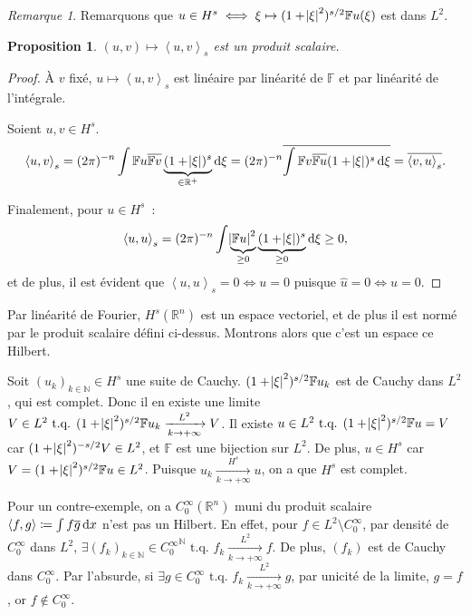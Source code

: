 \documentclass{report}
\newcommand{\R}{{\mathbb R}}
\newcommand{\N}{{\mathbb N}}
\newcommand{\scpr}[2]{\left\langle#1, #2\right\rangle}
\newcommand{\tq}{\text{ t.q. }}
\newcommand{\pinfty}{{+\infty}}
\newcommand{\dx}{\dif x}
\newtheorem{prp}[thm]{Proposition}
\theoremstyle{definition}
\theoremstyle{remark}
\newtheorem*{rmq}{Remarque}
\begin{document}
\begin{rmq} Remarquons que $u \in H^s \iff \xi \mapsto (1+\abs \xi^2)^{s/2}\mathbb Fu(\xi)$ est dans $L^2$.
\end{rmq}


\begin{prp} $(u, v) \mapsto \scpr uv_s$ est un produit scalaire.
\end{prp}

\begin{proof} À $v$ fixé, $u \mapsto \scpr uv_s$ est linéaire par linéarité de $\mathbb F$ et par linéarité de l'intégrale.

Soient $u, v \in H^s$.
\[\scpr uv_s = (2\pi)^{-n}\int \mathbb Fu\overline {\mathbb Fv}\underbrace {(1+\abs \xi)^s}_{\in \R^+}\dif\xi
	= (2\pi)^{-n}\overline {\int \mathbb Fv\overline {\mathbb Fu}(1+\abs \xi)^s\dif\xi} = \overline {\scpr vu_s}.\]

Finalement, pour $u \in H^s$~:
\[\scpr uu_s = (2\pi)^{-n}\int\underbrace {\abs {\mathbb Fu}^2}_{\geq 0}\underbrace {(1+\abs\xi)^s}_{\geq 0}\dif\xi \geq 0,\]
et de plus, il est évident que $\scpr uu_s = 0 \iff u = 0$ puisque $\hat u = 0 \iff u = 0$.
\end{proof}

Par linéarité de Fourier, $H^s(\R^n)$ est un espace vectoriel, et de plus il est normé par le produit scalaire défini ci-dessus. Montrons alors que c'est un espace ce Hilbert.

Soit $(u_k)_{k \in \N} \in H^s$ une suite de Cauchy. $(1+\abs\xi^2)^{s/2}\mathbb Fu_k$ est de Cauchy dans $L^2$, qui est complet. Donc il en existe une limite
$V \in L^2 \tq (1+\abs\xi^2)^{s/2}\mathbb Fu_k \xrightarrow[k \to \pinfty]{L^2} V$. Il existe $u \in L^2 \tq (1+\abs\xi^2)^{s/2}\mathbb Fu = V$ car $(1+\abs\xi^2)^{-s/2}V \in L^2$,
et $\mathbb F$ est une bijection sur $L^2$. De plus, $u \in H^s$ car $V = (1+\abs\xi^2)^{s/2}\mathbb Fu \in L^2$. Puisque $u_k \xrightarrow[k \to \pinfty]{H^s} u$,
on a que $H^s$ est complet.

Pour un contre-exemple, on a $C^\infty_0(\R^n)$ muni du produit scalaire $\scpr fg \coloneqq \int f\overline g\dx$ n'est pas un Hilbert. En effet, pour $f \in L^2 \setminus C^\infty_0$,
par densité de $C^\infty_0$ dans $L^2$, $\exists (f_k)_{k \in \N} \in {C^\infty_0}^\N \tq f_k \xrightarrow[k \to \pinfty]{L^2} f$. De plus, $(f_k)$ est de Cauchy dans $C^\infty_0$.
Par l'absurde, si $\exists g \in C^\infty_0 \tq f_k \xrightarrow[k \to \pinfty]{L^2} g$, par unicité de la limite, $g=f$, or $f \not \in C^\infty_0$.
\end{document}
